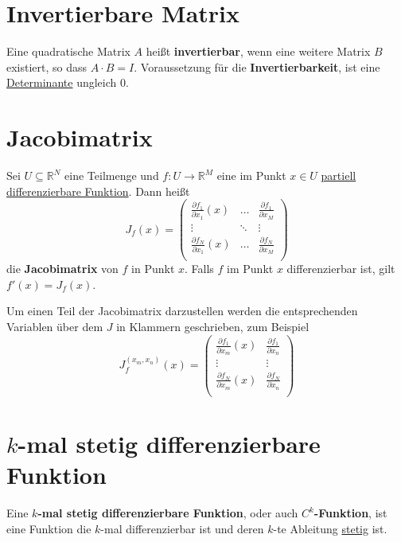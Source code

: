 \documentclass{scrreprt}
\begin{document}
\section{Invertierbare Matrix}
\label{sec:inv_matrix}

Eine quadratische Matrix $A$ heißt \textbf{invertierbar}, wenn eine weitere Matrix $B$
existiert, so dass $A \cdot B = \hyperref[sec:einheitsmatrix]{I}$.
Voraussetzung für die \textbf{Invertierbarkeit}, ist eine
\hyperref[sec:determinante]{Determinante} ungleich $0$.

\newpage
\section{Jacobimatrix}
\label{sec:jacobi}

Sei $U \subseteq \mathbb{R}^N$ eine Teilmenge und
$f \colon U \to \mathbb{R}^M$
eine im Punkt \( x \in U \)
\hyperref[sec:partielle_ableitung]{partiell differenzierbare Funktion}.
Dann heißt
\[
  J_f(x) = \begin{pmatrix}
    \frac{\partial f_1}{\partial x_1} (x) & \ldots & \frac{\partial f_1}{\partial x_M} \\
    \vdots & \ddots & \vdots \\
    \frac{\partial f_N}{\partial x_1} (x) & \ldots & \frac{\partial f_N}{\partial x_M} \\
  \end{pmatrix}
\]
die \textbf{Jacobimatrix} von $f$ in Punkt $x$.
Falls $f$ im Punkt $x$ differenzierbar ist, gilt $f'(x) = J_f(x)$.

Um einen Teil der Jacobimatrix darzustellen werden die entsprechenden Variablen
über dem $J$ in Klammern geschrieben, zum Beispiel
\[
  J_f^{(x_m, x_n)}(x) = \begin{pmatrix}
    \frac{\partial f_1}{\partial x_m} (x) & \frac{\partial f_1}{\partial x_n} \\
    \vdots & \vdots \\
    \frac{\partial f_N}{\partial x_m} (x) & \frac{\partial f_N}{\partial x_n} \\
  \end{pmatrix}
\]

\section{$k$-mal stetig differenzierbare Funktion}
\label{sec:c-k-funktion}

Eine \textbf{$k$-mal stetig differenzierbare Funktion}, oder auch
\textbf{$C^k$-Funktion}, ist eine Funktion die $k$-mal differenzierbar ist
und deren $k$-te Ableitung \hyperref[sec:stetige_funktion]{stetig} ist.
\end{document}
